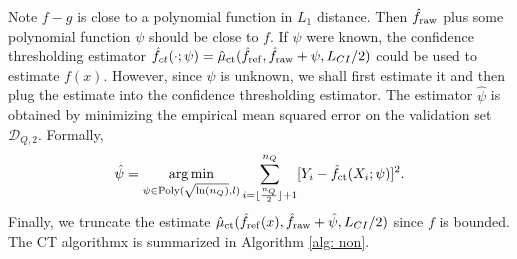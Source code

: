 \documentclass{article}
\def\D{\mathcal{D}}
\newcommand{\argmin}{\mathop{\rm arg\min}}
\begin{document}
Note $f-g$ is close to a polynomial function in $L_1$ distance. Then $\hat f_{\rm raw}$ plus some polynomial function $\psi$ should be close to $f$. If $\psi$ were known,  the confidence thresholding estimator 
$\hat f_{ct}(\cdot;\psi)=\hat \mu_{\rm ct}(\hat f_{\rm ref},\hat f_{\rm raw}+\psi,L_{CI}/2)$ could be used to estimate $f(x)$. However, since $\psi$ is unknown, we shall first estimate it  and then plug the estimate into the confidence thresholding estimator. The estimator $\hat \psi$ is obtained by minimizing the empirical mean squared error on the validation set $\D_{Q,2}$. Formally,
$$\hat \psi=\argmin_{\psi\in \text{Poly}(\sqrt{\ln(n_Q)}, l)}\sum_{i= \lfloor\frac{n_{Q}}{2}\rfloor+1}^{n_Q}[Y_{i}-\hat f_{\rm ct}(X_i;\psi)]^2.$$
Finally, we truncate the estimate  $\hat \mu_{\rm ct}(\hat f_{\rm ref}(x),\hat f_{\rm raw}+\hat \psi,L_{CI}/2)$ since  $f$ is bounded.  The CT algorithmx is summarized in Algorithm \ref{alg: non}.
\end{document}
